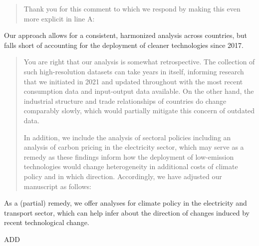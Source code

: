 \documentclass[11pt]{article}
\newenvironment{response}
{\begin{quote}\color{black}}
{\end{quote}}
\begin{document}
\begin{response}
    Thank you for this comment to which we respond by making this even more explicit in line A:
\end{response}

\begin{revisionbox}
    Our approach allows for a consistent, harmonized analysis across countries, but falls short of accounting for the deployment of cleaner technologies since 2017.
\end{revisionbox}

\begin{response}
  You are right that our analysis is somewhat retrospective. The collection of such high-resolution datasets can take years in itself, informing research that we initiated in 2021 and updated throughout with the most recent consumption data and input-output data available. On the other hand, the industrial structure and trade relationships of countries do change comparably slowly, which would partially mitigate this concern of outdated data.

  In addition, we include the analysis of sectoral policies including an analysis of carbon pricing in the electricity sector, which may serve as a remedy as these findings inform how the deployment of low-emission technologies would change heterogeneity in additional costs of climate policy and in which direction. Accordingly, we have adjusted our manuscript as follows:

\end{response}

\begin{revisionbox}
    As a (partial) remedy, we offer analyses for climate policy in the electricity and transport sector, which can help infer about the direction of changes induced by recent technological change.
\end{revisionbox}

\begin{revisionbox}
    ADD
\end{revisionbox}
\end{document}
